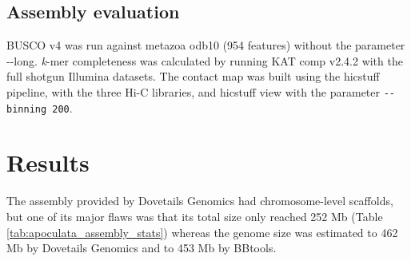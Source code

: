 \subsection{Assembly evaluation}

BUSCO v4 \cite{busco_evaluation} was run against metazoa odb10 (954 features) without the parameter -{}-long. \textit{k}-mer completeness was calculated by running KAT comp v2.4.2 \cite{kat_evaluation} with the full shotgun Illumina datasets. The contact map was built using the hicstuff pipeline, with the three Hi-C libraries, and hicstuff view with the parameter \texttt{-{}-binning 200}.

\section{Results}

The assembly provided by Dovetails Genomics had chromosome-level scaffolds, but one of its major flaws was that its total size only reached 252 Mb (Table \ref{tab:apoculata_assembly_stats}) whereas the genome size was estimated to 462 Mb by Dovetails Genomics and to 453 Mb by BBtools. 

